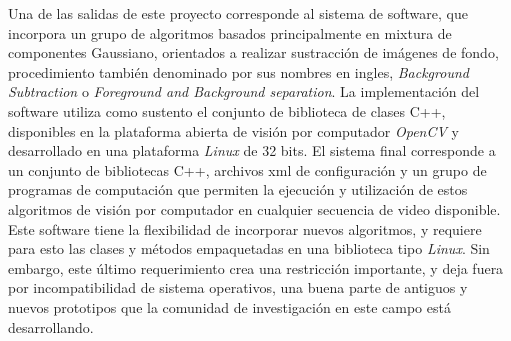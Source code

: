 Una de las salidas de este proyecto corresponde al sistema de software, que incorpora un grupo de algoritmos basados principalmente en mixtura de componentes Gaussiano, orientados a realizar sustracción de imágenes de fondo, procedimiento también denominado por sus nombres en ingles, \textit{Background Subtraction} o \textit{Foreground and Background separation}. La implementación del software utiliza como sustento el conjunto de biblioteca de clases C++, disponibles en la plataforma abierta de visión por computador \textit{OpenCV} y desarrollado en una plataforma \textit{Linux} de 32 bits. El sistema final corresponde a un conjunto de bibliotecas C++, archivos xml de configuración y un grupo de programas de computación que permiten la ejecución y utilización de estos algoritmos de visión por computador en cualquier secuencia de video disponible.  Este software tiene la flexibilidad de incorporar nuevos algoritmos, y requiere para esto las clases y métodos empaquetadas en una biblioteca tipo \textit{Linux}. Sin embargo, este último requerimiento crea una restricción importante, y deja fuera por incompatibilidad de sistema operativos, una buena parte de antiguos y nuevos prototipos que la comunidad de investigación en este campo está desarrollando.


